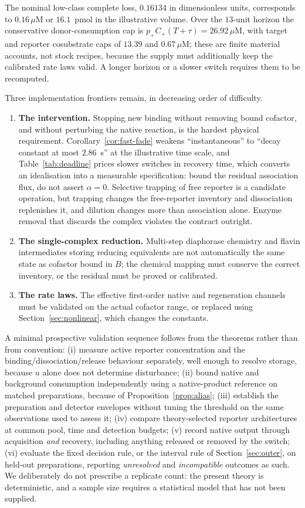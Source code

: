 \documentclass[11pt]{article}
\theoremstyle{definition}
\theoremstyle{remark}
\begin{document}
The nominal low-class complete loss, $0.16134$ in dimensionless units,
corresponds to $0.16\,\mu$M or $16.1$~pmol in the illustrative volume. Over the
$13$-unit horizon the conservative donor-consumption cap is
$p_+C_+(T+\tau)=26.92\,\mu$M, with target and reporter cosubstrate caps of
$13.39$ and $0.67\,\mu$M; these are finite material accounts, not stock
recipes, because the supply must additionally keep the calibrated rate laws
valid. A longer horizon or a slower switch requires them to be recomputed.

Three implementation frontiers remain, in decreasing order of difficulty.

\begin{enumerate}
\item \textbf{The intervention.} Stopping new binding without removing bound
cofactor, and without perturbing the native reaction, is the hardest physical
requirement. Corollary~\ref{cor:fast-fade} weakens ``instantaneous'' to ``decay
constant at most $2.86$~s'' at the illustrative time scale, and
Table~\ref{tab:deadline} prices slower switches in recovery time, which converts
an idealisation into a measurable specification: bound the residual association
flux, do not assert $\alpha=0$. Selective trapping of free reporter is a
candidate operation, but trapping changes the free-reporter inventory and
dissociation replenishes it, and dilution changes more than association alone.
Enzyme removal that discards the complex violates the contract outright.
\item \textbf{The single-complex reduction.} Multi-step diaphorase chemistry
and flavin intermediates storing reducing equivalents are not automatically the
same state as cofactor bound in $B$; the chemical mapping must conserve the
correct inventory, or the residual must be proved or calibrated.
\item \textbf{The rate laws.} The effective first-order native and regeneration
channels must be validated on the actual cofactor range, or replaced using
Section~\ref{sec:nonlinear}, which changes the constants.
\end{enumerate}

A minimal prospective validation sequence follows from the theorems rather than
from convention: (i) measure active reporter concentration and the
binding/dissociation/release behaviour separately, well enough to resolve
storage, because $u$ alone does not determine disturbance; (ii) bound native and
background consumption independently using a native-product reference on matched
preparations, because of Proposition~\ref{prop:alias}; (iii) establish the
preparation and detector envelopes without tuning the threshold on the same
observations used to assess it; (iv) compare theory-selected reporter
architectures at common pool, time and detection budgets; (v) record native
output through acquisition \emph{and} recovery, including anything released or
removed by the switch; (vi) evaluate the fixed decision rule, or the interval
rule of Section~\ref{sec:outer}, on held-out preparations, reporting
\emph{unresolved} and \emph{incompatible} outcomes as such. We deliberately do
not prescribe a replicate count: the present theory is deterministic, and a
sample size requires a statistical model that has not been supplied.
\end{document}
